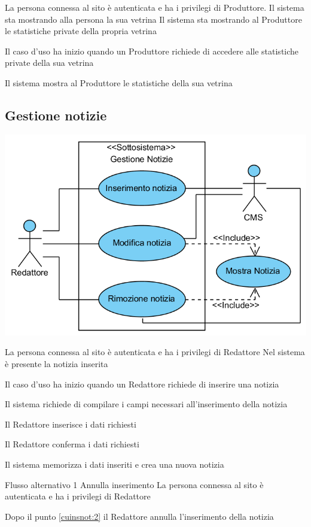 
{}
{La persona connessa al sito è autenticata e ha i privilegi di Produttore. Il sistema sta mostrando alla persona la sua vetrina}
{Il sistema sta mostrando al Produttore le statistiche private della propria vetrina}
{\begin{enumCU}
		\item Il caso d'uso ha inizio quando un Produttore richiede di accedere alle statistiche private della sua vetrina
		\item Il sistema mostra al Produttore le statistiche della sua vetrina
	\end{enumCU}}

\subsection{Gestione notizie}
\begin{center}
   \includegraphics[width=\textwidth]{assets/visualParadigm/cu/GestioneNotizie}
\end{center}
%
{}
{La persona connessa al sito è autenticata e ha i privilegi di Redattore}
{Nel sistema è presente la notizia inserita}
{\begin{enumCU}
	\item Il caso d'uso ha inizio quando un Redattore richiede di inserire una notizia  
	\item Il sistema richiede di compilare i campi necessari all'inserimento della notizia
	\item Il Redattore inserisce i dati richiesti \label{cuinsnot:2}
	\item Il Redattore conferma i dati richiesti
	\item Il sistema memorizza i dati inseriti e crea una nuova notizia
\end{enumCU}}
%
{Flusso alternativo 1}%
{Annulla inserimento}%
{La persona connessa al sito è autenticata e ha i privilegi di Redattore}%
{\postNulle}%
{\begin{enumCU}
		\item Dopo il punto \ref{cuinsnot:2} il Redattore annulla l'inserimento della notizia
	\end{enumCU}}%

